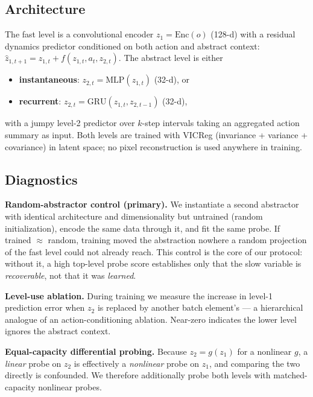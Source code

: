 \documentclass[11pt]{article}
\begin{document}
\subsection{Architecture}

The fast level is a convolutional encoder $z_1 = \text{Enc}(o)$ (128-d) with a residual dynamics predictor conditioned on both action and abstract context: $\hat z_{1,t+1} = z_{1,t} + f(z_{1,t}, a_t, z_{2,t})$. The abstract level is either

\begin{itemize}
\item \textbf{instantaneous}: $z_{2,t} = \text{MLP}(z_{1,t})$ (32-d), or
\item \textbf{recurrent}: $z_{2,t} = \text{GRU}(z_{1,t}, z_{2,t-1})$ (32-d),
\end{itemize}

with a jumpy level-2 predictor over $k$-step intervals taking an aggregated action summary as input. Both levels are trained with VICReg \citep{bardes2021vicreg} (invariance + variance + covariance) in latent space; no pixel reconstruction is used anywhere in training.

\subsection{Diagnostics}

\textbf{Random-abstractor control (primary).} We instantiate a second abstractor with identical architecture and dimensionality but untrained (random initialization), encode the same data through it, and fit the same probe. If trained $\approx$ random, training moved the abstraction nowhere a random projection of the fast level could not already reach. This control is the core of our protocol: without it, a high top-level probe score establishes only that the slow variable is \emph{recoverable}, not that it was \emph{learned}.

\textbf{Level-use ablation.} During training we measure the increase in level-1 prediction error when $z_2$ is replaced by another batch element's --- a hierarchical analogue of an action-conditioning ablation. Near-zero indicates the lower level ignores the abstract context.

\textbf{Equal-capacity differential probing.} Because $z_2 = g(z_1)$ for a nonlinear $g$, a \emph{linear} probe on $z_2$ is effectively a \emph{nonlinear} probe on $z_1$, and comparing the two directly is confounded. We therefore additionally probe both levels with matched-capacity nonlinear probes.
\end{document}
